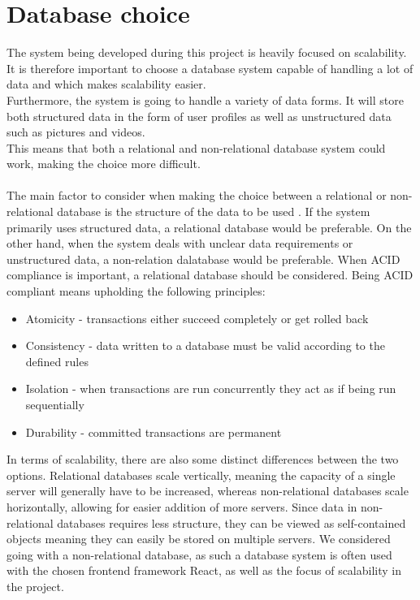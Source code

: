 \section{Database choice}
The system being developed during this project is heavily focused on scalability.
It is therefore important to choose a database system capable of handling a lot of data and which makes scalability easier.
\\
Furthermore, the system is going to handle a variety of data forms. It will store both structured data in the form of user profiles as well as unstructured data such as pictures and videos.
\\
This means that both a relational and non-relational database system could work, making the choice more difficult.
\\\\
The main factor to consider when making the choice between a relational or non-relational database is the structure of the data to be used \cite{sqlvsnosql}.
If the system primarily uses structured data, a relational database would be preferable.
On the other hand, when the system deals with unclear data requirements or unstructured data, a non-relation dalatabase would be preferable. 
When ACID compliance is important, a relational database should be considered.
Being ACID compliant means upholding the following principles\cite{sqlvsnosql}:
\begin{itemize}
    \item Atomicity - transactions either succeed completely or get rolled back
    \item Consistency - data written to a database must be valid according to the defined rules
    \item Isolation - when transactions are run concurrently they act as if being run sequentially
    \item Durability - committed transactions are permanent 
\end{itemize}
In terms of scalability, there are also some distinct differences between the two options. 
Relational databases scale vertically, meaning the capacity of a single server will generally have to be increased, whereas non-relational databases scale horizontally, allowing for easier addition of more servers.
Since data in non-relational databases requires less structure, they can be viewed as self-contained objects meaning they can easily be stored on multiple servers.
We considered going with a non-relational database, as such a database system is often used with the chosen frontend framework React, as well as the focus of scalability in the project.
